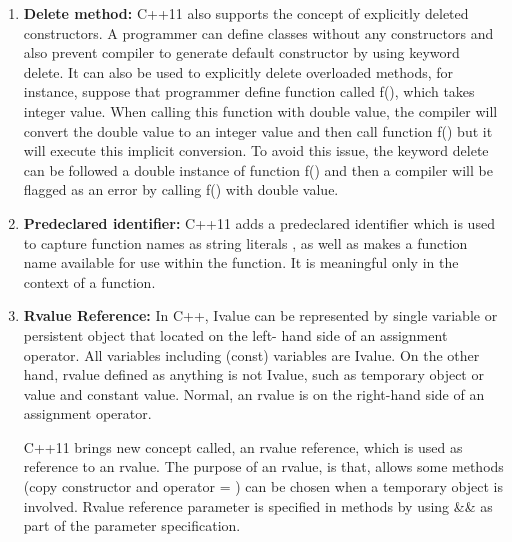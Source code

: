 \documentclass[11pt]{report}
\begin{document}
\begin{enumerate}
\item \textbf{Delete method:} C++11 also supports the concept of explicitly deleted constructors. A programmer can define classes without any \linebreak constructors and also prevent compiler to generate default constructor by using keyword delete.  It can also be used to explicitly delete \linebreak overloaded methods, for instance, suppose that programmer define \linebreak function called f(), which takes integer value. When calling this \linebreak function with double value, the compiler will convert the double value to an integer value and then call function f() but it will execute this \linebreak implicit conversion. To avoid this issue, the keyword delete can be \linebreak followed a double instance of function f() and then a compiler will be flagged as an error by calling f() with double value\cite{Gregorie:professionalcpp}.
  
\item \textbf{Predeclared identifier:} C++11 adds a predeclared identifier which is used to capture function names as string literals , as well as makes a function name available for use within the function. It is meaningful only in the context of a function\cite{Gregorie:professionalcpp}.

\item \textbf{Rvalue Reference:} In C++, Ivalue can be represented by single variable or persistent object that located on the left- hand side of an   assignment operator. All variables including (const) variables are Ivalue. On the other hand, rvalue defined as anything is not Ivalue, such as temporary object or value and constant value. Normal, an rvalue is on the  right-hand side of an assignment operator. 

C++11 brings new concept called, an rvalue reference, which is used as reference to an rvalue. The purpose of an rvalue, is that, allows some methods (copy constructor and operator = ) can be chosen when \linebreak a temporary object is involved. Rvalue reference parameter is specified in methods by using \&\& as part of the parameter specification\cite{Gregorie:professionalcpp}. 
\end{enumerate}
 
  
 
\end{document}
